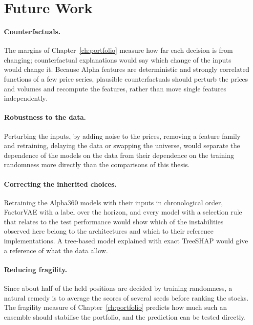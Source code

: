 \section{Future Work}
\label{sec:conc_future}

\paragraph{Counterfactuals.} The margins of Chapter~\ref{ch:portfolio} measure how far each decision is from changing; counterfactual explanations would say which change of the inputs would change it. Because Alpha features are deterministic and strongly correlated functions of a few price series, plausible counterfactuals should perturb the prices and volumes and recompute the features, rather than move single features independently.

\paragraph{Robustness to the data.} Perturbing the inputs, by adding noise to the prices, removing a feature family and retraining, delaying the data or swapping the universe, would separate the dependence of the models on the data from their dependence on the training randomness more directly than the comparisons of this thesis.

\paragraph{Correcting the inherited choices.} Retraining the Alpha360 models with their inputs in chronological order, FactorVAE with a label over the horizon, and every model with a selection rule that relates to the test performance would show which of the instabilities observed here belong to the architectures and which to their reference implementations. A tree-based model explained with exact TreeSHAP would give a reference of what the data allow.

\paragraph{Reducing fragility.} Since about half of the held positions are decided by training randomness, a natural remedy is to average the scores of several seeds before ranking the stocks. The fragility measure of Chapter~\ref{ch:portfolio} predicts how much such an ensemble should stabilise the portfolio, and the prediction can be tested directly.
